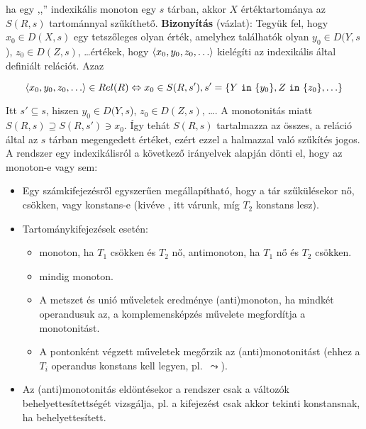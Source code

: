 
\tetel ha egy ,,'' indexikális monoton egy $s$ tárban, akkor
$X$ értéktartománya az $S(R,s)$ tartománnyal szűkíthető.
\br
{\bf Bizonyítás} (vázlat): Tegyük fel, hogy $x_0 \in D(X,s)$ egy tetszőleges olyan
érték, amelyhez találhatók olyan $y_0 \in D(Y,s$), $z_0 \in D(Z,s)$, \ldots értékek, hogy 
$\left\langle x_0,y_0,z_0,\ldots\right\rangle$ kielégíti az indexikális által definiált relációt. Azaz

\[ \left\langle x_0,y_0,z_0,\ldots\right\rangle \in Rel(R) \Leftrightarrow x_0 \in S(R, s'), 
s'= \{Y~\texttt{in}~\{y_0\},Z~\texttt{in}~\{z_0\},\ldots\} \]

Itt $s' \subseteq s$, hiszen $y_0 \in D(Y,s$), $z_0 \in D(Z,s)$,
\ldots. A monotonitás miatt $S(R, s)
\supseteq S(R, s') \ni x_0$. Így tehát $S(R, s)$ tartalmazza az összes, a
reláció által az $s$ tárban megengedett értéket, ezért ezzel a halmazzal
való szűkítés jogos.
\br
A \clpfd rendszer egy indexikálisról a következő irányelvek alapján dönti el, hogy
az monoton-e vagy sem:

\begin{itemize}
\item Egy számkifejezésről egyszerűen megállapítható, hogy a tár
szűkülésekor nő, csökken, vagy konstans-e (kivéve , itt
várunk, míg $T_2$ konstans lesz).
\item Tartománykifejezések esetén:
\begin{itemize}
\item {} monoton, ha $T_1$ csökken és $T_2$ nő, antimonoton,
 ha $T_1$ nő és $T_2$ csökken.
\item {} mindig monoton.
\item A metszet és unió műveletek eredménye (anti)monoton, ha mindkét
operandusuk az, a komplemensképzés művelete megfordítja a monotonitást.
\item A pontonként végzett műveletek megőrzik az (anti)monotonitást (ehhez a
$T_i$ operandus konstans kell legyen, pl.\ $\leadsto$).
\end{itemize}
\item Az (anti)monotonitás eldöntésekor a rendszer csak a változók behelyettesítettségét
vizsgálja, pl. a  kifejezést csak akkor tekinti
konstansnak, ha  behelyettesített.
\end{itemize}

